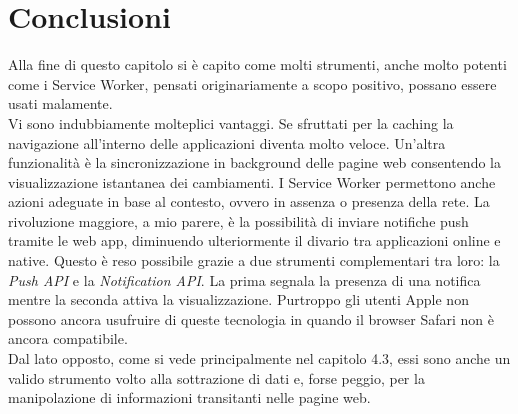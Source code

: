 \documentclass[12pt ,a4paper , twoside , openright ]{book}
\begin{document}
	\section{Conclusioni}
	Alla fine di questo capitolo si è capito come molti strumenti, anche molto potenti come i Service Worker, pensati originariamente a scopo positivo, possano essere usati malamente. \\
	Vi sono indubbiamente molteplici vantaggi. Se sfruttati per la caching la navigazione all'interno delle applicazioni diventa molto veloce. Un'altra funzionalità è la sincronizzazione in background delle pagine web consentendo la visualizzazione istantanea dei cambiamenti. I Service Worker permettono anche azioni adeguate in base al contesto, ovvero in assenza o presenza della rete. La rivoluzione maggiore, a mio parere, è la possibilità di inviare notifiche push tramite le web app, diminuendo ulteriormente il divario tra applicazioni online e native. Questo è reso possibile grazie a due strumenti complementari tra loro: la \textit{Push API} e la \textit{Notification API}. La prima segnala la presenza di una notifica mentre la seconda attiva la visualizzazione. Purtroppo gli utenti Apple non possono ancora usufruire di queste tecnologia in quando il browser Safari non è ancora compatibile. \\
	Dal lato opposto, come si vede principalmente nel capitolo 4.3, essi sono anche un valido strumento volto alla sottrazione di dati e, forse peggio, per la manipolazione di informazioni transitanti nelle pagine web.
	\newpage
\end{document}
